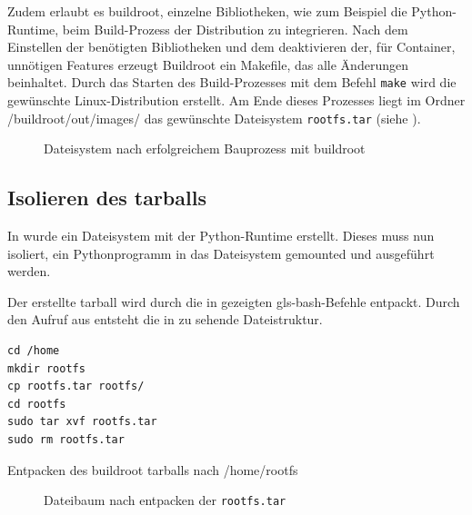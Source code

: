 Zudem erlaubt es buildroot, einzelne Bibliotheken, wie zum Beispiel die Python-Runtime, beim Build-Prozess der Distribution zu integrieren. Nach dem Einstellen der benötigten Bibliotheken und dem deaktivieren der, für Container, unnötigen Features erzeugt Buildroot ein Makefile, das alle Änderungen beinhaltet. Durch das Starten des Build-Prozesses mit dem Befehl \texttt{make} wird die gewünschte Linux-Distribution erstellt. Am Ende dieses Prozesses liegt im Ordner /buildroot/out/images/ das gewünschte Dateisystem \texttt{rootfs.tar} (siehe ).

\begin{figure}[h]
		\centering
		\begin{minipage}{0.9\textwidth}
		\end{minipage}
		\caption{Dateisystem nach erfolgreichem Bauprozess mit buildroot}
		\label{fig:dirtreeNachBuildroot}
\end{figure} 


\subsection{Isolieren des tarballs}
\label{sec:isolieren}
In  wurde ein Dateisystem mit der Python-Runtime erstellt. Dieses muss nun isoliert, ein Pythonprogramm in das Dateisystem gemounted und ausgeführt werden.

Der erstellte tarball wird durch die in  gezeigten \gls{gls-bash}-Befehle entpackt. Durch den Aufruf aus  entsteht die in  zu sehende Dateistruktur.

\begin{listing}[h]
	\begin{verbatim}
cd /home
mkdir rootfs
cp rootfs.tar rootfs/
cd rootfs
sudo tar xvf rootfs.tar
sudo rm rootfs.tar
	\end{verbatim}
	\caption{Entpacken des buildroot tarballs nach /home/rootfs}
	\label{lst:untarRootfs}
\end{listing}


\begin{figure}[h]
	\centering
	\begin{minipage}{0.9\textwidth}
	\end{minipage}
	\caption{Dateibaum nach entpacken der \texttt{rootfs.tar}}
	\label{fig:baumNachUntar}
\end{figure}

